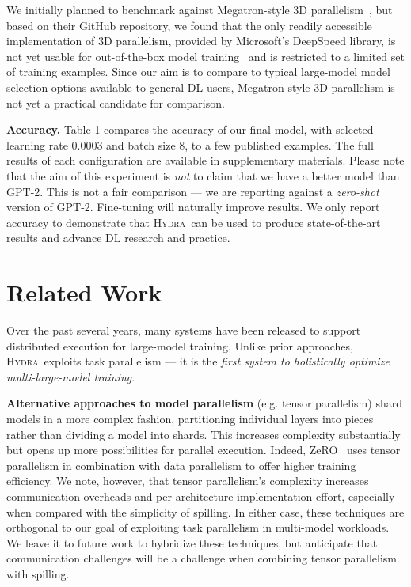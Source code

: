 \documentclass{article}
\newcommand{\system}{\textsc{Hydra}}
\begin{document}
{{We initially planned to benchmark against Megatron-style 3D parallelism~\cite{narayanan2021efficient}, but based on their GitHub repository, we found that the only readily accessible implementation of 3D parallelism, provided by Microsoft's DeepSpeed library, is not yet usable for out-of-the-box model training~\cite{deepspeedissue1,deepspeedissue2} and is restricted to a limited set of training examples. Since our aim is to compare to typical large-model model selection options available to general DL users, Megatron-style 3D parallelism is not yet a practical candidate for comparison.

\textbf{Accuracy.} Table 1 compares the accuracy of our final model, with selected learning rate 0.0003 and batch size 8, to a few published examples. The full results of each configuration are available in supplementary materials. Please note that the aim of this experiment is \textit{not} to claim that we have a better model than GPT-2. This is not a fair comparison --- we are reporting against a \textit{zero-shot} version of GPT-2. Fine-tuning will naturally improve results. We only report accuracy to demonstrate that \system~can be used to produce state-of-the-art results and advance DL research and practice. 

\section{Related Work}
\label{sec:related}
Over the past several years, many systems have been released to support distributed execution for large-model training. Unlike prior approaches, \system~exploits task parallelism --- it is the \textit{first system to holistically optimize multi-large-model training}.

\textbf{Alternative approaches to model parallelism} (e.g. tensor parallelism) shard models in a more complex fashion, partitioning individual layers into pieces rather than dividing a model into shards. This increases complexity substantially but opens up more possibilities for parallel execution. Indeed, ZeRO~\cite{zeroDeep,zeroOpt} uses tensor parallelism in combination with data parallelism to offer higher training efficiency. We note, however, that tensor parallelism's complexity increases communication overheads and per-architecture implementation effort, especially when compared with the simplicity of spilling. In either case, these techniques are orthogonal to our goal of exploiting task parallelism in multi-model workloads. We leave it to future work to hybridize these techniques, but anticipate that communication challenges will be a challenge when combining tensor parallelism with spilling.

}}
\end{document}
